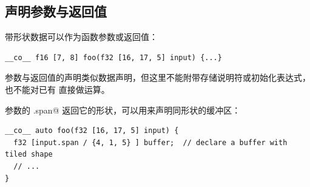 \subsection*{声明参数与返回值}

带形状数据可以作为函数参数或返回值：

\begin{lstlisting}[language=croqtile,caption={显式的返回形状}]
__co__ f16 [7, 8] foo(f32 [16, 17, 5] input) {...}
\end{lstlisting}

参数与返回值的声明类似数据声明，但这里不能附带存储说明符或初始化表达式，也不能对已有 \co@mdspan@ 直接做运算。

参数的 \co@.span@ 返回它的形状，可以用来声明同形状的缓冲区：

\begin{lstlisting}[language=croqtile,caption={推导出的返回形状}]
__co__ auto foo(f32 [16, 17, 5] input) {
  f32 [input.span / {4, 1, 5} ] buffer;  // declare a buffer with tiled shape
  // ...
}
\end{lstlisting}
